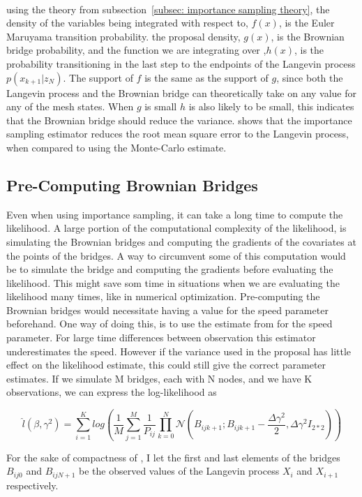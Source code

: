 \

using the theory from subsection~\ref{subsec: importance sampling theory}, the density of the variables being integrated with respect to, $f(x)$, is the Euler Maruyama transition probability. the proposal density, $g(x)$, is the Brownian bridge probability, and the function we are integrating over ,$h(x)$, is the probability transitioning in the last step to the endpoints of the Langevin process $p(x_{k+1}|z_N)$. The support of $f$ is the same as the support of $g$, since both the Langevin process and the Brownian bridge can theoretically take on any value for any of the mesh states. When $g$ is small $h$ is also likely to be small, this indicates that the Brownian bridge should reduce the variance. \parencite{durham_numerical_2002}  shows that the importance sampling estimator reduces the root mean square error to the Langevin process, when compared to using the Monte-Carlo estimate.


\subsection{Pre-Computing Brownian Bridges}
\label{subsec: precomputing brownian bridges}
Even when using importance sampling, it can take a long time to compute the likelihood. A large portion of the computational complexity of the likelihood, is simulating the Brownian bridges and computing the gradients of the covariates at the points of the bridges. A way to circumvent some of this computation would be to simulate the bridge and computing the gradients before evaluating the likelihood. This might save som time in situations when we are evaluating the likelihood many times, like in numerical optimization. Pre-computing the Brownian bridges would necessitate having a value for the speed parameter beforehand. One way of doing this, is to use the estimate from \parencite{michelot_langevin_2019} for the speed parameter. For large time differences between observation this estimator underestimates the speed. However if the variance used in the proposal has little effect on the likelihood estimate, this could still give the correct parameter estimates. If we simulate M bridges, each with N nodes, and we have K observations, we can express the log-likelihood as 

$$
\hat{l}(\beta, \gamma^2) = \sum_{i = 1}^K log( \frac{1}{M}\sum_{j=1}^M \frac{1}{P_{ij}}\prod_{k=0}^N \mathcal{N}(B_{ijk+1} ; B_{ijk+1} - \frac{\Delta \gamma^2}{2}, \Delta\gamma^2 I_{2*2}))
$$

For the sake of compactness of , I let the first and last elements of the bridges $B_{ij0}$ and $B_{ijN+1}$ be the observed values of the Langevin process $X_i$ and $X_{i+1}$ respectively.



